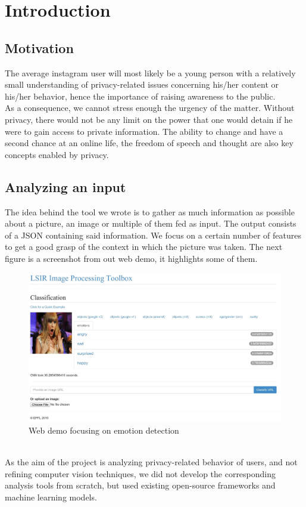 \documentclass{article}
\begin{document}
\newpage
\section{Introduction}
    \subsection{Motivation}
        The average instagram user will most likely be a young person with a relatively small understanding of privacy-related issues concerning his/her content or his/her behavior, hence the importance of raising awareness to the public. 
        \\As a consequence, we cannot stress enough the urgency of the matter. Without privacy, there would not be any limit on the power that one would detain if he were to gain access to private information. The ability to change and have a second chance at an online life, the freedom of speech and thought are also key concepts enabled by privacy.
    \subsection{Analyzing an input}
        The idea behind the tool we wrote is to gather as much information as possible about a picture, an image or multiple of them fed as input. The output consists of a JSON containing said information. We focus on a certain number of features to get a good grasp of the context in which the picture was taken. The next figure is a screenshot from out web demo, it highlights some of them. 
        \begin{figure}[h]
            \centering
            \includegraphics[scale=0.18]{emotions.jpg}
            \caption{Web demo focusing on emotion detection}
          \label{fig:emotions}
        \end{figure}
        \\As the aim of the project is analyzing privacy-related behavior of users, and not refining computer vision techniques, we did not develop the corresponding analysis tools from scratch, but used existing open-source frameworks and machine learning models.
\end{document}
